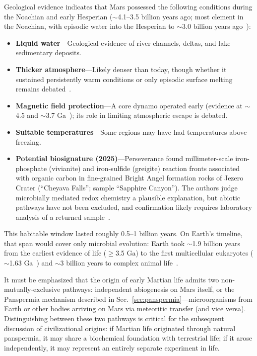\documentclass[aps,prd,twocolumn,superscriptaddress,nofootinbib]{revtex4-2}
\begin{document}
Geological evidence indicates that Mars possessed the following conditions during the Noachian and early Hesperian (${\sim}$4.1--3.5 billion years ago; most clement in the Noachian, with episodic water into the Hesperian to ${\sim}$3.0 billion years ago~\cite{Carr2010}):

\begin{itemize}
  \item \textbf{Liquid water}---Geological evidence of river channels, deltas, and lake sedimentary deposits.
  \item \textbf{Thicker atmosphere}---Likely denser than today, though whether it sustained persistently warm conditions or only episodic surface melting remains debated~\cite{Wordsworth2016}.
  \item \textbf{Magnetic field protection}---A core dynamo operated early (evidence at ${\sim}$4.5 and ${\sim}$3.7 Ga~\cite{Mittelholz2020}); its role in limiting atmospheric escape is debated.
  \item \textbf{Suitable temperatures}---Some regions may have had temperatures above freezing.
  \item \textbf{Potential biosignature (2025)}---Perseverance found millimeter-scale iron-phosphate (vivianite) and iron-sulfide (greigite) reaction fronts associated with organic carbon in fine-grained Bright Angel formation rocks of Jezero Crater (``Cheyava Falls''; sample ``Sapphire Canyon''). The authors judge microbially mediated redox chemistry a plausible explanation, but abiotic pathways have not been excluded, and confirmation likely requires laboratory analysis of a returned sample~\cite{Hurowitz2025}.
\end{itemize}

This habitable window lasted roughly 0.5--1 billion years. On Earth's timeline, that span would cover only microbial evolution: Earth took ${\sim}$1.9 billion years from the earliest evidence of life ($\geq$3.5 Ga) to the first multicellular eukaryotes (${\sim}$1.63 Ga~\cite{Miao2024}) and ${\sim}$3 billion years to complex animal life~\cite{Knoll2011}.

It must be emphasized that the origin of early Martian life admits two non-mutually-exclusive pathways: independent abiogenesis on Mars itself, or the Panspermia mechanism described in Sec.~\ref{sec:panspermia}---microorganisms from Earth or other bodies arriving on Mars via meteoritic transfer (and vice versa). Distinguishing between these two pathways is critical for the subsequent discussion of civilizational origins: if Martian life originated through natural panspermia, it may share a biochemical foundation with terrestrial life; if it arose independently, it may represent an entirely separate experiment in life.
\end{document}
